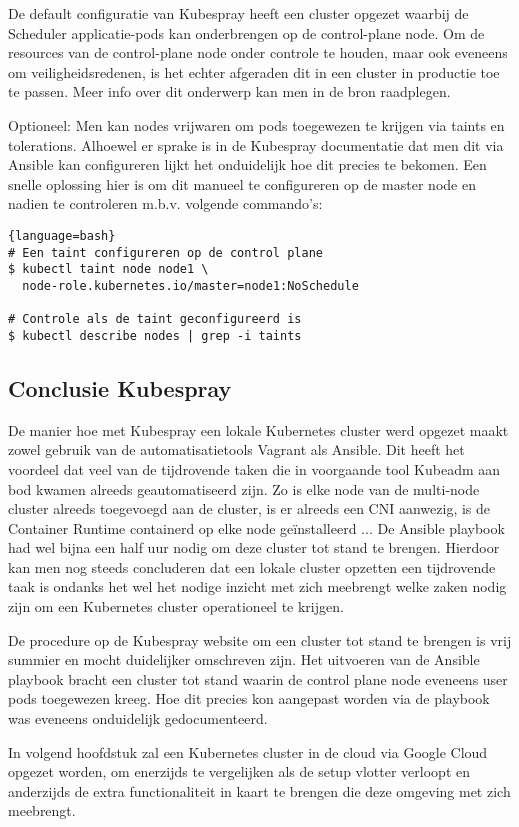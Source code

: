 De default configuratie van Kubespray heeft een cluster opgezet waarbij de Scheduler applicatie-pods kan onderbrengen op de control-plane node. Om de resources van de control-plane node onder controle te houden, maar ook eveneens om veiligheidsredenen, is het echter afgeraden dit in een cluster in productie toe te passen. Meer info over dit onderwerp kan men in de bron raadplegen. \autocite{Bailey2016}

Optioneel: Men kan nodes vrijwaren om pods toegewezen te krijgen via taints en tolerations. Alhoewel er sprake is in de Kubespray documentatie dat men dit via Ansible kan configureren lijkt het onduidelijk hoe dit precies te bekomen. \autocite{Kubespray2022b}
Een snelle oplossing hier is om dit manueel te configureren op de master node en nadien te controleren m.b.v. volgende commando's: 
\begin{lstlisting}{language=bash}
# Een taint configureren op de control plane
$ kubectl taint node node1 \ 
  node-role.kubernetes.io/master=node1:NoSchedule

# Controle als de taint geconfigureerd is
$ kubectl describe nodes | grep -i taints

\end{lstlisting}

\subsection{Conclusie Kubespray}

De manier hoe met Kubespray een lokale Kubernetes cluster werd opgezet maakt zowel gebruik van de automatisatietools Vagrant als Ansible. Dit heeft het voordeel dat veel van de tijdrovende taken die in voorgaande tool Kubeadm aan bod kwamen alreeds geautomatiseerd zijn. Zo is elke node van de multi-node cluster alreeds toegevoegd aan de cluster, is er alreeds een CNI aanwezig, is de Container Runtime containerd op elke node geïnstalleerd ... De Ansible playbook had wel bijna een half uur nodig om deze cluster tot stand te brengen. Hierdoor kan men nog steeds concluderen dat een lokale cluster opzetten een tijdrovende taak is ondanks het wel het nodige inzicht met zich meebrengt welke zaken nodig zijn om een Kubernetes cluster operationeel te krijgen. 

De procedure op de Kubespray website om een cluster tot stand te brengen is vrij summier en mocht duidelijker omschreven zijn. Het uitvoeren van de Ansible playbook bracht een cluster tot stand waarin de control plane node eveneens user pods toegewezen kreeg. Hoe dit precies kon aangepast worden via de playbook was eveneens onduidelijk gedocumenteerd. 

In volgend hoofdstuk zal een Kubernetes cluster in de cloud via Google Cloud opgezet worden, om enerzijds te vergelijken als de setup vlotter verloopt en anderzijds de extra functionaliteit in kaart te brengen die deze omgeving met zich meebrengt.